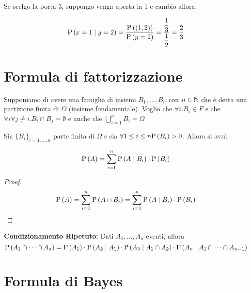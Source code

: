 Se scelgo la porta 3, suppongo venga aperta la 1 e cambio allora:

\begin{equation}
	\text{P}\left(x=1  \mid  y=2\right) = \dfrac{\text{P}\left((1,2)\right)}{\text{P}\left(y=2\right)} = \dfrac{\dfrac{1}{3}}{\dfrac{1}{2}} = \dfrac{2}{3}
\end{equation}

\section{Formula di fattorizzazione}


Supponiamo di avere una famiglia di insiemi $ B_1, \dots, B_n $ con $ n \in \mathbb{N} $ che è detta una partizione finita di $ \Omega $ (insieme fondamentale). Voglio che $ \forall i . B_i \in F $ e che $ \forall i \forall j\neq i . B_i \cap B_j = \emptyset $ e anche che $ \bigcup_{i=1}^{n} B_i = \Omega $


\begin{lem}
	Sia $ \{B_i\}_{i=1, \dots, n} $ parte finita di $ \Omega $ e sia $ \forall 1 \leq i \leq n \text{P}\left(B_i\right) > 0 $. Allora si avrà
	
	\begin{equation}
		\text{P}\left(A\right) = \sum_{i=1}^{n} \text{P}\left(A \mid B_i\right) \cdot \text{P}\left(B_i\right)
	\end{equation}
	
	\begin{proof}
		\begin{equation*}
			\text{P}\left(A\right) =  \sum_{i=1}^{n} \text{P}\left(A \cap B_i\right) = \sum_{i=1}^{n} \text{P}\left(A \mid B_i\right) \cdot \text{P}\left(B_i\right)
		\end{equation*}
	\end{proof}
\end{lem}

\begin{defn}
	\textbf{Condizionamento Ripetuto:}
	Dati $ A_1, \dots, A_n $ eventi, allora 
	\begin{equation*}
		\text{P}\left(A_1 \cap \dots \cap A_n\right) = \text{P}\left(A_1\right) \cdot \text{P}\left(A_2 \mid A_1\right) \cdot \text{P}\left(A_3 \mid  A_1 \cap A_2\right) \cdot \text{P}\left(A_n  \mid  A_1 \cap \dots \cap A_{n-1}\right)
	\end{equation*}
\end{defn}

\section{Formula di Bayes}

